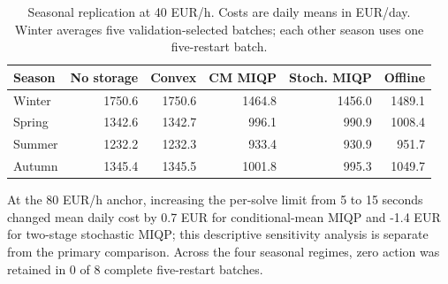 \begin{table}[t]
\centering
\caption{Seasonal replication at 40 EUR/h. Costs are daily means in EUR/day. Winter averages five validation-selected batches; each other season uses one five-restart batch.}
\label{tab:seasons}
\begin{tabular}{lrrrrr}
\toprule
Season & No storage & Convex & CM MIQP & Stoch. MIQP & Offline \\
\midrule
Winter & 1750.6 & 1750.6 & 1464.8 & 1456.0 & 1489.1 \\
Spring & 1342.6 & 1342.7 & 996.1 & 990.9 & 1008.4 \\
Summer & 1232.2 & 1232.3 & 933.4 & 930.9 & 951.7 \\
Autumn & 1345.4 & 1345.5 & 1001.8 & 995.3 & 1049.7 \\
\bottomrule
\end{tabular}
\end{table}

 At the 80 EUR/h anchor, increasing the per-solve limit from 5 to 15 seconds changed mean daily cost by 0.7 EUR for conditional-mean MIQP and -1.4 EUR for two-stage stochastic MIQP; this descriptive sensitivity analysis is separate from the primary comparison. Across the four seasonal regimes, zero action was retained in 0 of 8 complete five-restart batches.
